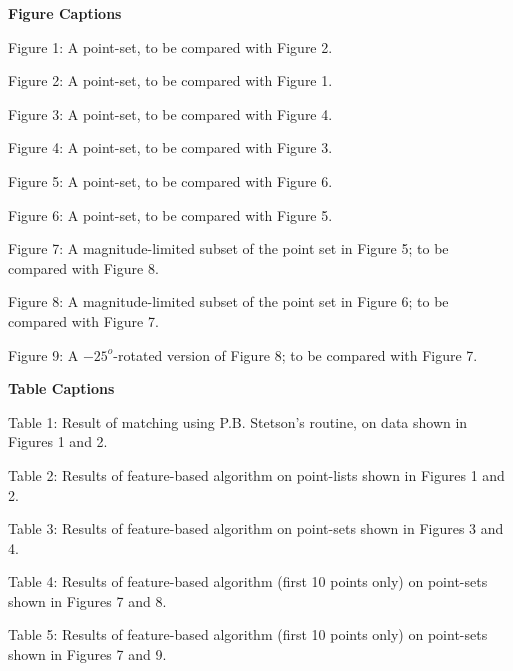 \parindent 0pt

\newpage 
{\bf Figure Captions}

\bigskip

\bigskip

\bigskip

Figure 1: A point-set, to be compared with Figure 2.

\bigskip

Figure 2: A point-set, to be compared with Figure 1.

\bigskip

Figure 3: A point-set, to be compared with Figure 4.

\bigskip

Figure 4: A point-set, to be compared with Figure 3.

\bigskip

Figure 5: A point-set, to be compared with Figure 6.

\bigskip

Figure 6: A point-set, to be compared with Figure 5.

\bigskip

Figure 7: A magnitude-limited subset of the point set in Figure 5; to be compared
with Figure 8.

\bigskip

Figure 8: A magnitude-limited subset of the point set in Figure 6; to be 
compared with Figure 7.

\bigskip

Figure 9: A $-25^o$-rotated version of Figure 8; to be compared with Figure 7.
 
\bigskip

\bigskip

\bigskip

{\bf Table Captions}

\bigskip

\bigskip

\bigskip

Table 1: Result of matching using P.B. Stetson's routine, on data shown in
Figures 1 and 2.

\bigskip

Table 2: Results of feature-based algorithm on point-lists shown in Figures 1
and 2. 

\bigskip

Table 3: Results of feature-based algorithm on point-sets shown in Figures 3 
and 4. 

\bigskip

Table 4: Results of feature-based algorithm (first 10 points only) 
on point-sets shown in Figures 7 and
8.

\bigskip

Table 5: Results of feature-based algorithm (first 10 points only) 
on point-sets shown in Figures 7 and
9.



\bye

